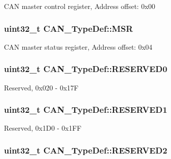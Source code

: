 C\-A\-N master control register, Address offset\-: 0x00 \hypertarget{struct_c_a_n___type_def_af98b957a4e887751fbd407d3e2cf93b5}{
\subsubsection[{M\-S\-R}]{ uint32\-\_\-t C\-A\-N\-\_\-\-Type\-Def\-::\-M\-S\-R}}\label{struct_c_a_n___type_def_af98b957a4e887751fbd407d3e2cf93b5}
C\-A\-N master status register, Address offset\-: 0x04 \hypertarget{struct_c_a_n___type_def_af394c92193f1e52feaa7a27e090374ed}{
\subsubsection[{R\-E\-S\-E\-R\-V\-E\-D0}]{\setlength{\rightskip}{0pt plus 5cm}uint32\-\_\-t C\-A\-N\-\_\-\-Type\-Def\-::\-R\-E\-S\-E\-R\-V\-E\-D0}}\label{struct_c_a_n___type_def_af394c92193f1e52feaa7a27e090374ed}
Reserved, 0x020 -\/ 0x17\-F \hypertarget{struct_c_a_n___type_def_abd4c34405c765b5bd5fe38bbeb7569b6}{
\subsubsection[{R\-E\-S\-E\-R\-V\-E\-D1}]{\setlength{\rightskip}{0pt plus 5cm}uint32\-\_\-t C\-A\-N\-\_\-\-Type\-Def\-::\-R\-E\-S\-E\-R\-V\-E\-D1}}\label{struct_c_a_n___type_def_abd4c34405c765b5bd5fe38bbeb7569b6}
Reserved, 0x1\-D0 -\/ 0x1\-F\-F \hypertarget{struct_c_a_n___type_def_ab29069c9fd10eeec47414abd8d06822f}{
\subsubsection[{R\-E\-S\-E\-R\-V\-E\-D2}]{\setlength{\rightskip}{0pt plus 5cm}uint32\-\_\-t C\-A\-N\-\_\-\-Type\-Def\-::\-R\-E\-S\-E\-R\-V\-E\-D2}}\label{struct_c_a_n___type_def_ab29069c9fd10eeec47414abd8d06822f}
